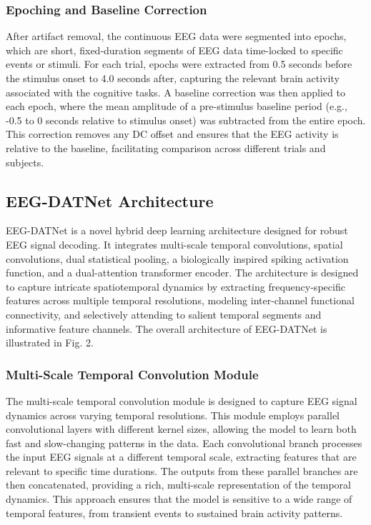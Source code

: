 \documentclass[pdflatex,sn-mathphys-num]{sn-jnl}
\theoremstyle{thmstyleone}%
\theoremstyle{thmstyletwo}%
\theoremstyle{thmstylethree}%
\begin{document}
\subsubsection{Epoching and Baseline Correction}
After artifact removal, the continuous EEG data were segmented into epochs, which are short, fixed-duration segments of EEG data time-locked to specific events or stimuli. For each trial, epochs were extracted from 0.5 seconds before the stimulus onset to 4.0 seconds after, capturing the relevant brain activity associated with the cognitive tasks. A baseline correction was then applied to each epoch, where the mean amplitude of a pre-stimulus baseline period (e.g., -0.5 to 0 seconds relative to stimulus onset) was subtracted from the entire epoch. This correction removes any DC offset and ensures that the EEG activity is relative to the baseline, facilitating comparison across different trials and subjects.

\subsection{EEG-DATNet Architecture}
EEG-DATNet is a novel hybrid deep learning architecture designed for robust EEG signal decoding. It integrates multi-scale temporal convolutions, spatial convolutions, dual statistical pooling, a biologically inspired spiking activation function, and a dual-attention transformer encoder. The architecture is designed to capture intricate spatiotemporal dynamics by extracting frequency-specific features across multiple temporal resolutions, modeling inter-channel functional connectivity, and selectively attending to salient temporal segments and informative feature channels. The overall architecture of EEG-DATNet is illustrated in Fig. 2.

\subsubsection{Multi-Scale Temporal Convolution Module}

The multi-scale temporal convolution module is designed to capture EEG signal dynamics across varying temporal resolutions. This module employs parallel convolutional layers with different kernel sizes, allowing the model to learn both fast and slow-changing patterns in the data. Each convolutional branch processes the input EEG signals at a different temporal scale, extracting features that are relevant to specific time durations. The outputs from these parallel branches are then concatenated, providing a rich, multi-scale representation of the temporal dynamics. This approach ensures that the model is sensitive to a wide range of temporal features, from transient events to sustained brain activity patterns.
\end{document}

